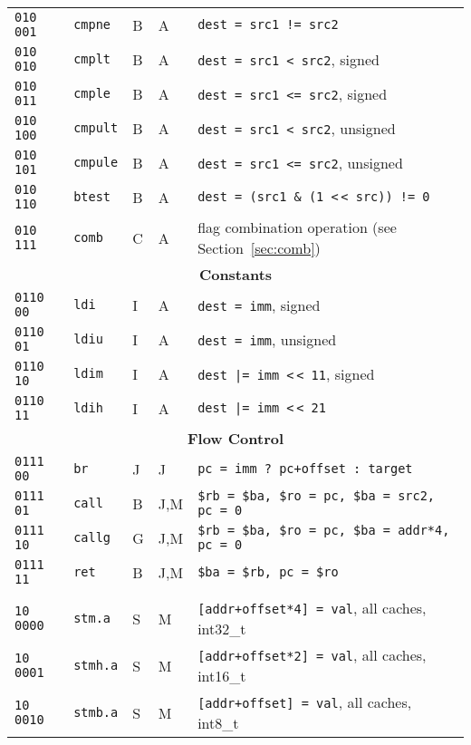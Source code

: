 \documentclass[10pt,DIV12]{scrartcl}
\newcommand{\shl}{\textless$\,\!$\textless}
\begin{document}
\begin{longtable}{llllp{}}
\texttt{010 001} & \texttt{cmpne} & B & A & \texttt{dest = src1 != src2} \\
\texttt{010 010} & \texttt{cmplt} & B & A & \texttt{dest = src1 \textless{} src2}, signed \\
\texttt{010 011} & \texttt{cmple} & B & A & \texttt{dest = src1 \textless{}= src2}, signed \\
\texttt{010 100} & \texttt{cmpult} & B & A & \texttt{dest = src1 \textless{} src2}, unsigned \\
\texttt{010 101} & \texttt{cmpule} & B & A & \texttt{dest = src1 \textless{}= src2}, unsigned \\
\texttt{010 110} & \texttt{btest} & B & A & \texttt{dest = (src1 \& (1 \shl{} src)) != 0} \\
\texttt{010 111} & \texttt{comb} & C & A & flag combination operation (see Section~\ref{sec:comb}) \\
\midrule
\multicolumn{5}{c}{\textsf{\textbf{Constants}}} \\
\cmidrule{1-5}
\texttt{0110 00} & \texttt{ldi} & I & A & \texttt{dest = imm}, signed \\
\texttt{0110 01} & \texttt{ldiu} & I & A & \texttt{dest = imm}, unsigned \\
\texttt{0110 10} & \texttt{ldim} & I & A & \texttt{dest |= imm \shl{} 11}, signed \\
\texttt{0110 11} & \texttt{ldih} & I & A & \texttt{dest |= imm \shl{} 21} \\
\midrule
\multicolumn{5}{c}{\textsf{\textbf{Flow Control}}} \\
\cmidrule{1-5}
\texttt{0111 00} & \texttt{br} & J & J & \texttt{pc = imm ?\ pc+offset :\ target} \\
\texttt{0111 01} & \texttt{call} & B & J,M & \texttt{\$rb = \$ba, \$ro = pc, \$ba = src2, pc = 0} \\
\texttt{0111 10} & \texttt{callg} & G & J,M & \texttt{\$rb = \$ba, \$ro = pc, \$ba = addr*4, pc = 0} \\
\texttt{0111 11} & \texttt{ret} & B & J,M & \texttt{\$ba = \$rb, pc = \$ro} \\
\midrule
\pagebreak
\midrule
\multicolumn{5}{c}{\textsf{\textbf{Memory Accesses}}} \\
\cmidrule{1-5}
\texttt{10 0000} & \texttt{stm.a} & S & M & \texttt{[addr+offset*4] = val}, all caches, int32\_t \\
\texttt{10 0001} & \texttt{stmh.a} & S & M & \texttt{[addr+offset*2] = val}, all caches, int16\_t \\
\texttt{10 0010} & \texttt{stmb.a} & S & M & \texttt{[addr+offset] = val}, all caches, int8\_t \\

\end{longtable}
\end{document}
